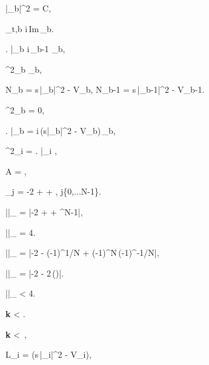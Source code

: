 \documentclass{article}
\begin{document}
{|\Psi_b|^2 = C,

\label{msdfixedstb}
\Psi_{t,b} \approx i\,\mbox{Im}\,\Psi_b.

\left. \right|_b \approx i\,\Omega_{b-1} \Psi_b,

\label{msdlap}
\nabla^2\Psi_b \approx {}\Psi_b,

N_b = s\,|\Psi_b|^2 - V_b, \qquad N_{b-1} = s\,|\Psi_{b-1}|^2 - V_{b-1}.

\nabla^2\Psi_b = 0,

\left. \right|_b = i\,(s|\Psi_b|^2 - V_b)\,\Psi_b,

\nabla^2\Psi_i = \left.  \right|_i \approx {},

A = ,

\lambda_j = -2 + \exp{} +  \exp{}, \qquad j\in\{0,...N-1\}.

|\lambda|_{\max} = \left|-2 + \exp\left[\pi i\right] + \exp\left[\pi i\right]^{N-1}\right|,

|\lambda|_{\max} = 4.

|\lambda|_{\max} = \left|-2 - (-1)^{1/N} + (-1)^N\,(-1)^{-1/N}\right|,

|\lambda|_{\max} = \left|-2 - 2\,\cos\left(\right)\right|.

|\lambda|_{\max} < 4.

\label{1dcircbound}
{\bf k} < .

\label{1dcircboundL}
{\bf k} < \,,

\label{Leq}
L_i = (s\,|\Psi_i|^2 - V_i),

}
\end{document}
